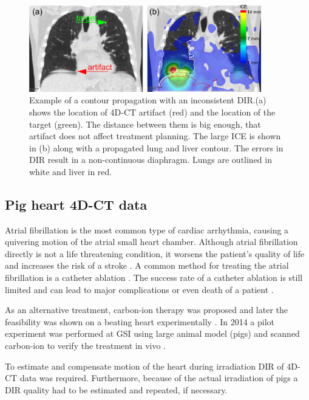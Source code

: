 \begin{figure}[H]
	\begin{center}		
		\includegraphics[width=0.9\textwidth]{./Vmm/Images/ContourPropagation/contourPropagation.png}
		\caption{Example of a contour propagation with an inconsistent DIR.(a) shows the location of 4D-CT artifact (red) and the location of the target (green). 
		The distance between them is big enough, that artifact does not affect treatment planning. 
		The large ICE is shown in (b) along with a propagated lung and liver contour. The errors in DIR result in a non-continuous diaphragm. Lungs are outlined in white and liver in red.}
		\label{contourPropagation}
	\end{center}
\end{figure}


\newpage
\subsection{Pig heart 4D-CT data}

Atrial fibrillation is the most common type of cardiac arrhythmia, causing a quivering motion of the atrial small heart chamber. 
Although atrial fibrillation directly is not a life threatening condition, it worsens the patient's quality of life and increases the risk of a stroke \cite{Benjamin1998}. 
A common method for treating the atrial fibrillation is a catheter ablation \cite{January2014}. The success rate of a catheter ablation is still limited and 
can lead to major complications or even death of a patient \cite{Cappato2005,Cappato2010}.

As an alternative treatment, carbon-ion therapy was proposed \cite{Bert2012} and later the feasibility was shown on a beating heart experimentally \cite{Lehmann2015b}. 
In 2014 a pilot experiment was performed at GSI using large animal model (pigs) and
scanned carbon-ion to verify the treatment in vivo \cite{Graeff2014a}.

To estimate and compensate motion of the heart during irradiation DIR of 4D-CT data was required. Furthermore, because of the actual irradiation of pigs a DIR quality had to be estimated and repeated, if necessary.


